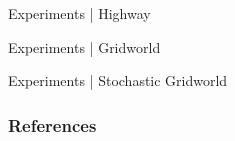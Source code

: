 \documentclass{beamer}
\begin{document}
\begin{frame}{Experiments | Highway}
    
\end{frame}
\begin{frame}{Experiments | Gridworld}
    
\end{frame}
\begin{frame}{Experiments | Stochastic Gridworld}
    
\end{frame}

\begin{frame}[allowframebreaks]
        \frametitle{References}
        \printbibliography
\end{frame}
\end{document}
